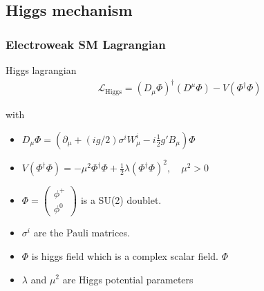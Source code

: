 \documentclass[11pt]{beamer}
\begin{document}
\begin{frame}
\subsection{Higgs mechanism}
\frametitle{Electroweak SM Lagrangian}
Higgs lagrangian 
\begin{align}
\mathcal{L}_{\text{Higgs}}=(D_\mu \Phi)^\dagger (D^\mu \Phi)-V(\Phi^\dagger \Phi)
\end{align}

with
\begin{itemize}
	\item $D_\mu \Phi = \left(\partial_\mu+(ig/2)\sigma^iW^i_\mu-i\frac{1}{2} g' B_\mu \right) \Phi $
	\item $V(\Phi^\dagger \Phi)=-\mu^2 \Phi^\dagger \Phi +\frac{1}{2}  \lambda (\Phi^\dagger \Phi)^2, \quad \mu^2>0  $ 
	\item $\Phi=\left(\begin{array}{c}
	\phi^+ \\
	\phi^0
	\end{array} \right)  $ is a SU(2) doublet.
	\item $\sigma^i$ are the Pauli matrices.
\end{itemize}
 
\begin{itemize}
	\item $\Phi$ is higgs field which is a complex scalar field. $\Phi$
	\item $\lambda $ and $\mu^2$ are Higgs potential parameters
\end{itemize}
\end{frame}
\end{document}
